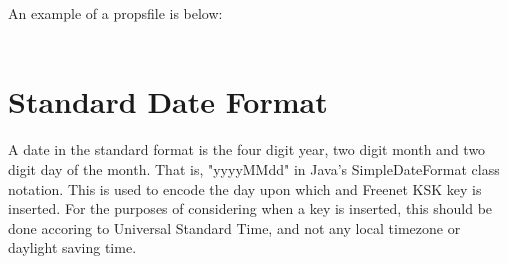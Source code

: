 \documentclass[12pt,a4paper]{article}
\begin{document}
An example of a propsfile is below: \\
\\

\section{Standard Date Format}
\label{standard_date}
A date in the standard format is the four digit year, two digit month and two digit day of the month. That is, "yyyyMMdd" in Java's SimpleDateFormat class notation. This is used to encode the day upon which and Freenet KSK key is inserted. For the purposes of considering when a key is inserted, this should be done accoring to Universal Standard Time, and not any local timezone or daylight saving time.
\end{document}
